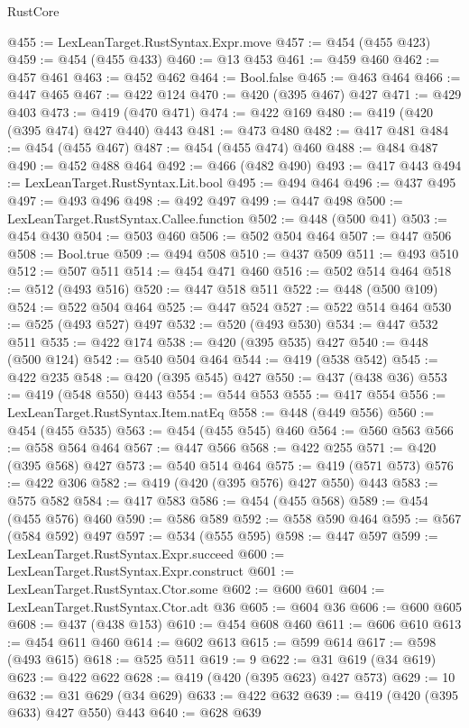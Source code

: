 \begin{lexlean}{RustCore}
\begin{coremodule}
@455 := LexLeanTarget.RustSyntax.Expr.move
@457 := @454 (@455 @423)
@459 := @454 (@455 @433)
@460 := @13 @453
@461 := @459 @460
@462 := @457 @461
@463 := @452 @462
@464 := Bool.false
@465 := @463 @464
@466 := @447 @465
@467 := @422 @124
@470 := @420 (@395 @467) @427
@471 := @429 @403
@473 := @419 (@470 @471)
@474 := @422 @169
@480 := @419 (@420 (@395 @474) @427 @440) @443
@481 := @473 @480
@482 := @417 @481
@484 := @454 (@455 @467)
@487 := @454 (@455 @474) @460
@488 := @484 @487
@490 := @452 @488 @464
@492 := @466 (@482 @490)
@493 := @417 @443
@494 := LexLeanTarget.RustSyntax.Lit.bool
@495 := @494 @464
@496 := @437 @495
@497 := @493 @496
@498 := @492 @497
@499 := @447 @498
@500 := LexLeanTarget.RustSyntax.Callee.function
@502 := @448 (@500 @41)
@503 := @454 @430
@504 := @503 @460
@506 := @502 @504 @464
@507 := @447 @506
@508 := Bool.true
@509 := @494 @508
@510 := @437 @509
@511 := @493 @510
@512 := @507 @511
@514 := @454 @471 @460
@516 := @502 @514 @464
@518 := @512 (@493 @516)
@520 := @447 @518 @511
@522 := @448 (@500 @109)
@524 := @522 @504 @464
@525 := @447 @524
@527 := @522 @514 @464
@530 := @525 (@493 @527) @497
@532 := @520 (@493 @530)
@534 := @447 @532 @511
@535 := @422 @174
@538 := @420 (@395 @535) @427
@540 := @448 (@500 @124)
@542 := @540 @504 @464
@544 := @419 (@538 @542)
@545 := @422 @235
@548 := @420 (@395 @545) @427
@550 := @437 (@438 @36)
@553 := @419 (@548 @550) @443
@554 := @544 @553
@555 := @417 @554
@556 := LexLeanTarget.RustSyntax.Item.natEq
@558 := @448 (@449 @556)
@560 := @454 (@455 @535)
@563 := @454 (@455 @545) @460
@564 := @560 @563
@566 := @558 @564 @464
@567 := @447 @566
@568 := @422 @255
@571 := @420 (@395 @568) @427
@573 := @540 @514 @464
@575 := @419 (@571 @573)
@576 := @422 @306
@582 := @419 (@420 (@395 @576) @427 @550) @443
@583 := @575 @582
@584 := @417 @583
@586 := @454 (@455 @568)
@589 := @454 (@455 @576) @460
@590 := @586 @589
@592 := @558 @590 @464
@595 := @567 (@584 @592) @497
@597 := @534 (@555 @595)
@598 := @447 @597
@599 := LexLeanTarget.RustSyntax.Expr.succeed
@600 := LexLeanTarget.RustSyntax.Expr.construct
@601 := LexLeanTarget.RustSyntax.Ctor.some
@602 := @600 @601
@604 := LexLeanTarget.RustSyntax.Ctor.adt @36
@605 := @604 @36
@606 := @600 @605
@608 := @437 (@438 @153)
@610 := @454 @608 @460
@611 := @606 @610
@613 := @454 @611 @460
@614 := @602 @613
@615 := @599 @614
@617 := @598 (@493 @615)
@618 := @525 @511
@619 := 9
@622 := @31 @619 (@34 @619)
@623 := @422 @622
@628 := @419 (@420 (@395 @623) @427 @573)
@629 := 10
@632 := @31 @629 (@34 @629)
@633 := @422 @632
@639 := @419 (@420 (@395 @633) @427 @550) @443
@640 := @628 @639

\end{coremodule}
\end{lexlean}
